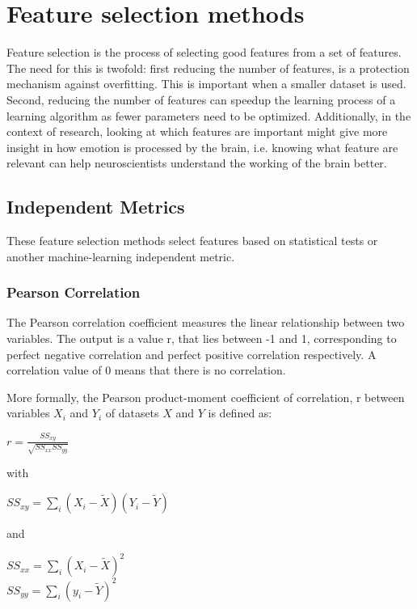 \section{Feature selection methods}
Feature selection is the process of selecting good features from a set of features. The need for this is twofold: first reducing the number of features, is a protection mechanism against overfitting. This is important when a smaller dataset is used. Second, reducing the number of features can speedup the learning process of a learning algorithm as fewer parameters need to be optimized. Additionally, in the context of research, looking at which features are important might give more insight in how emotion is processed by the brain, i.e. knowing what feature are relevant can help neuroscientists understand the working of the brain better.

\subsection{Independent Metrics}
These feature selection methods select features based on statistical tests or another machine-learning independent metric. 

\subsubsection{Pearson Correlation}
The Pearson correlation coefficient measures the linear relationship between two variables. The output is a value r, that lies between -1 and 1, corresponding to perfect negative correlation and perfect positive correlation respectively. A correlation value of 0 means that there is no correlation.

\npar

More formally\citep{corrPaper}, the Pearson product-moment coefficient of correlation, r between variables $X_i$ and $Y_i$ of datasets $X$ and $Y$ is defined as:


\begin{center}
$r = \frac{SS_{xy}}{\sqrt{SS_{xx}SS_{yy}}}$
\end{center}
with
\begin{center}
$SS_{xy} = \sum\limits_i (X_i-\tilde{X})(Y_i-\tilde{Y})$
\end{center}
and
\begin{center}
$SS_{xx} = \sum\limits_i (X_i-\tilde{X})^2$ \\
$SS_{yy} = \sum\limits_i (y_i-\tilde{Y})^2$
\end{center}

